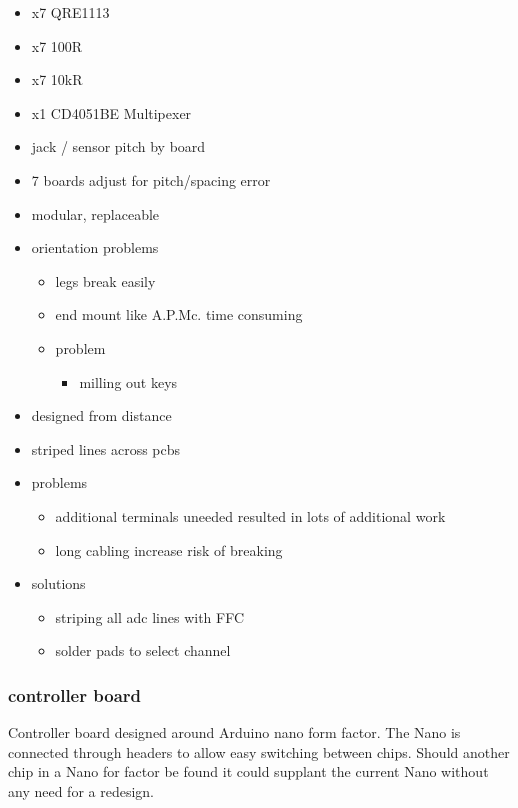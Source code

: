 \begin{itemize}
\item
  x7 QRE1113
\item
  x7 100R
\item
  x7 10kR
\item
  x1 CD4051BE Multipexer
\item
  jack / sensor pitch by board
\item
  7 boards adjust for pitch/spacing error
\item
  modular, replaceable
\item
  orientation problems

  \begin{itemize}
  \tightlist
  \item
    legs break easily
  \item
    end mount like A.P.Mc. time consuming
  \item
    problem

    \begin{itemize}
    \tightlist
    \item
      milling out keys
    \end{itemize}
  \end{itemize}
\item
  designed from distance
\item
  striped lines across pcbs
\item
  problems

  \begin{itemize}
  \tightlist
  \item
    additional terminals uneeded resulted in lots of additional work
  \item
    long cabling increase risk of breaking
  \end{itemize}
\item
  solutions

  \begin{itemize}
  \tightlist
  \item
    striping all adc lines with FFC
  \item
    solder pads to select channel
  \end{itemize}
\end{itemize}

\subsubsection{controller board}\label{controller-board}

Controller board designed around Arduino nano form factor. The Nano is
connected through headers to allow easy switching between chips. Should
another chip in a Nano for factor be found it could supplant the current
Nano without any need for a redesign.


